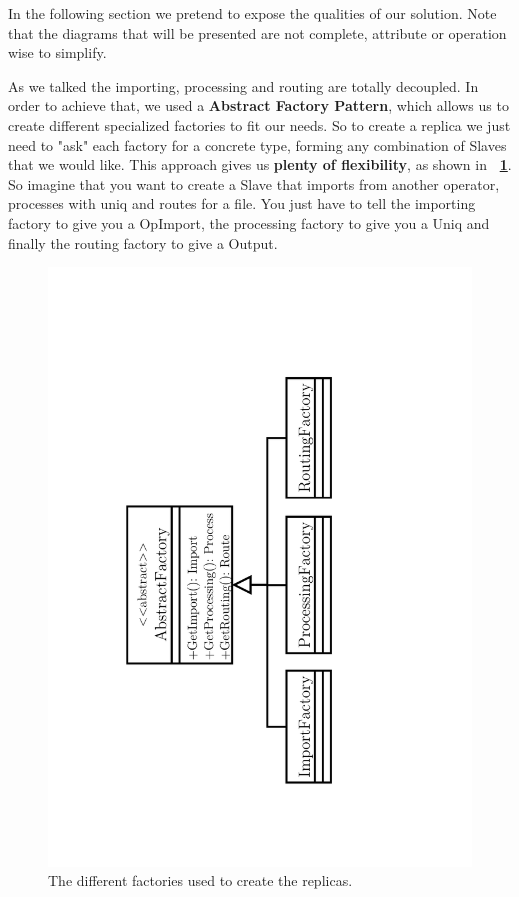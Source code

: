 \documentclass[times, 10pt,twocolumn]{article}
\begin{document}
In the following section we pretend to expose the qualities of our solution. Note that the diagrams that will be presented are not complete, attribute or operation wise to simplify.

As we talked the importing, processing and routing are totally decoupled. In order to achieve that, we used a \textbf{Abstract Factory Pattern}, which allows us to create different specialized factories to fit our needs. So to create a replica we just need to "ask" each factory for a concrete type, forming any combination of Slaves that we would like. This approach gives us \textbf{plenty of flexibility}, as shown in \textbf{~\cref{fig:factories}}. So imagine that you want to create a Slave that imports from another operator, processes with uniq and routes for a file. You just have to tell the importing factory to give you a OpImport, the processing factory to give you a Uniq and finally the routing factory to give a Output.

\begin{figure}[h]
\centering
	\includegraphics[scale=0.35]{"Architecture/Factories"}
    \caption{The different factories used to create the replicas. } 
    \label{fig:factories}
\end{figure}
\end{document}
